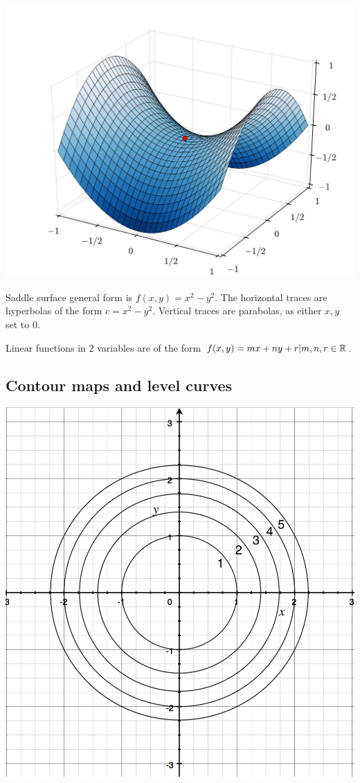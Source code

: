 \begin{center}
    \includegraphics[scale=0.15]{figures/saddle-plot.png}
\end{center}

Saddle surface general form is $f(x,y)=x^2-y^2$. The horizontal traces are hyperbolas of the form $c=x^2-y^2$.
Vertical traces are parabolas, as either $x,y$ set to 0.\newline

\noindent
Linear functions in 2 variables are of the form $f(x,y)=mx+ny+r|m,n,r\in \mathbb{R}$.

\subsection{Contour maps and level curves}

\begin{center}
    \includegraphics[scale=0.15]{figures/contour-map.png}
\end{center}

